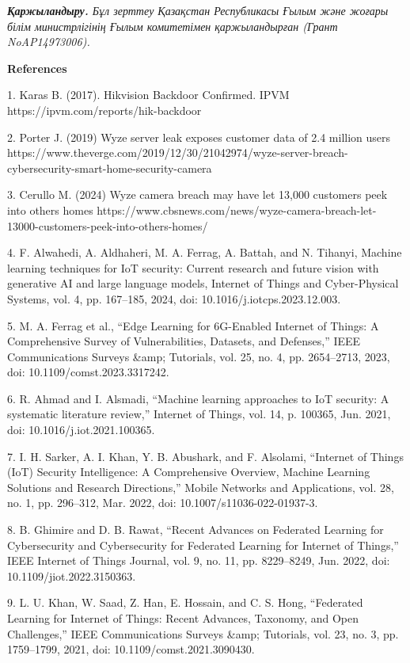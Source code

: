 \emph{{\bfseries Қаржыландыру.} Бұл зерттеу Қазақстан Республикасы Ғылым
және жоғары білім министрлігінің Ғылым комитетімен қаржыландырған (Грант
NoAP14973006).}

{\bfseries References}

1. Karas B. (2017). Hikvision Backdoor Confirmed. IPVM
https://ipvm.com/reports/hik-backdoor

2. Porter J. (2019) Wyze server leak exposes customer data of 2.4
million users
https://www.theverge.com/2019/12/30/21042974/wyze-server-breach-cybersecurity-smart-home-security-camera

3. Cerullo M. (2024) Wyze camera breach may have let 13,000 customers
peek into others\textquotesingle{} homes
https://www.cbsnews.com/news/wyze-camera-breach-let-13000-customers-peek-into-others-homes/

4. F. Alwahedi, A. Aldhaheri, M. A. Ferrag, A. Battah, and N. Tihanyi,
Machine learning techniques for IoT security: Current research and
future vision with generative AI and large language models, Internet of
Things and Cyber-Physical Systems, vol. 4, pp. 167--185, 2024, doi:
10.1016/j.iotcps.2023.12.003.

5. M. A. Ferrag et al., ``Edge Learning for 6G-Enabled Internet of
Things: A Comprehensive Survey of Vulnerabilities, Datasets, and
Defenses,'' IEEE Communications Surveys \&amp; Tutorials, vol. 25, no.
4, pp. 2654--2713, 2023, doi: 10.1109/comst.2023.3317242.

6. R. Ahmad and I. Alsmadi, ``Machine learning approaches to IoT
security: A systematic literature review,'' Internet of Things, vol. 14,
p. 100365, Jun. 2021, doi: 10.1016/j.iot.2021.100365.

7. I. H. Sarker, A. I. Khan, Y. B. Abushark, and F. Alsolami, ``Internet
of Things (IoT) Security Intelligence: A Comprehensive Overview, Machine
Learning Solutions and Research Directions,'' Mobile Networks and
Applications, vol. 28, no. 1, pp. 296--312, Mar. 2022, doi:
10.1007/s11036-022-01937-3.

8. B. Ghimire and D. B. Rawat, ``Recent Advances on Federated Learning
for Cybersecurity and Cybersecurity for Federated Learning for Internet
of Things,'' IEEE Internet of Things Journal, vol. 9, no. 11, pp.
8229--8249, Jun. 2022, doi: 10.1109/jiot.2022.3150363.

9. L. U. Khan, W. Saad, Z. Han, E. Hossain, and C. S. Hong, ``Federated
Learning for Internet of Things: Recent Advances, Taxonomy, and Open
Challenges,'' IEEE Communications Surveys \&amp; Tutorials, vol. 23, no.
3, pp. 1759--1799, 2021, doi: 10.1109/comst.2021.3090430.

